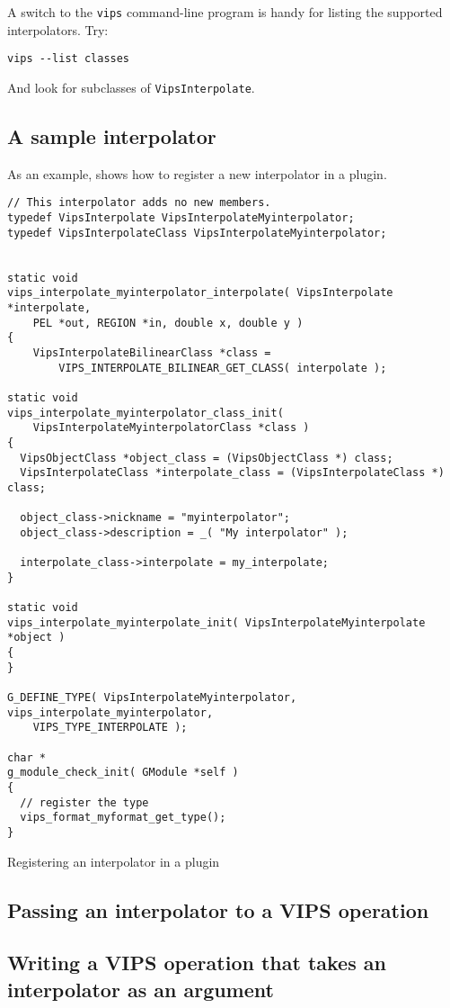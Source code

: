 A switch to the \verb+vips+ command-line program is handy for listing the
supported interpolators. Try:

\begin{verbatim}
vips --list classes
\end{verbatim}

\noindent
And look for subclasses of \verb+VipsInterpolate+.

\subsection{A sample interpolator}

As an example,  shows how to register a new
interpolator in a plugin.

\begin{fig2}
\begin{verbatim}
// This interpolator adds no new members.
typedef VipsInterpolate VipsInterpolateMyinterpolator;
typedef VipsInterpolateClass VipsInterpolateMyinterpolator;


static void
vips_interpolate_myinterpolator_interpolate( VipsInterpolate *interpolate, 
	PEL *out, REGION *in, double x, double y )
{
	VipsInterpolateBilinearClass *class = 
		VIPS_INTERPOLATE_BILINEAR_GET_CLASS( interpolate );

static void
vips_interpolate_myinterpolator_class_init( 
	VipsInterpolateMyinterpolatorClass *class )
{
  VipsObjectClass *object_class = (VipsObjectClass *) class;
  VipsInterpolateClass *interpolate_class = (VipsInterpolateClass *) class;

  object_class->nickname = "myinterpolator";
  object_class->description = _( "My interpolator" );

  interpolate_class->interpolate = my_interpolate;
}

static void
vips_interpolate_myinterpolate_init( VipsInterpolateMyinterpolate *object )
{
}

G_DEFINE_TYPE( VipsInterpolateMyinterpolator, vips_interpolate_myinterpolator, 
	VIPS_TYPE_INTERPOLATE );

char *
g_module_check_init( GModule *self )
{
  // register the type
  vips_format_myformat_get_type(); 
}
\end{verbatim}
\caption{Registering an interpolator in a plugin}
\label{fg:newinterpolator}
\end{fig2}

\subsection{Passing an interpolator to a VIPS operation}

\subsection{Writing a VIPS operation that takes an interpolator as an argument}

